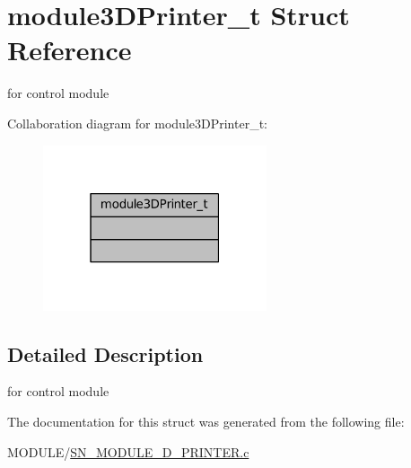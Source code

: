\hypertarget{structmodule3DPrinter__t}{}\section{module3\+D\+Printer\+\_\+t Struct Reference}
\label{structmodule3DPrinter__t}


for control module  




Collaboration diagram for module3\+D\+Printer\+\_\+t\+:\nopagebreak
\begin{figure}[H]
\begin{center}
\leavevmode
\includegraphics[width=187pt]{structmodule3DPrinter__t__coll__graph}
\end{center}
\end{figure}


\subsection{Detailed Description}
for control module 

The documentation for this struct was generated from the following file\+:\begin{DoxyCompactItemize}
\item 
M\+O\+D\+U\+L\+E/\hyperlink{SN__MODULE__3D__PRINTER_8c}{S\+N\+\_\+\+M\+O\+D\+U\+L\+E\+\_\+D\+\_\+\+P\+R\+I\+N\+T\+E\+R.\+c}\end{DoxyCompactItemize}
